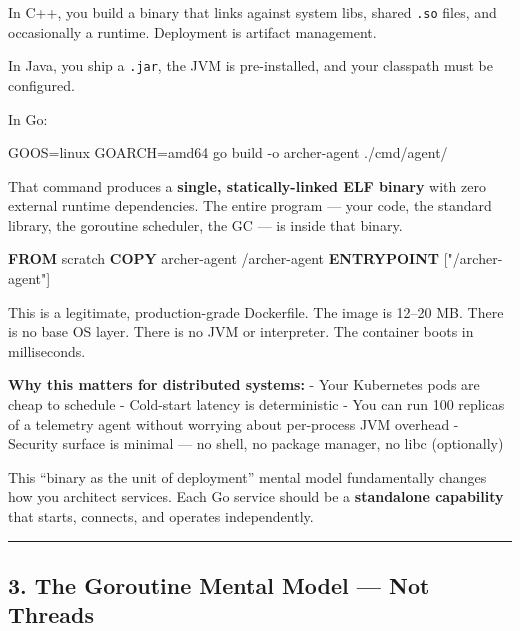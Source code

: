 \documentclass[
]{article}
\newenvironment{Shaded}{}{}
\newcommand{\AttributeTok}[1]{\textcolor[rgb]{0.49,0.56,0.16}{#1}}
\newcommand{\ExtensionTok}[1]{#1}
\newcommand{\KeywordTok}[1]{\textcolor[rgb]{0.00,0.44,0.13}{\textbf{#1}}}
\newcommand{\NormalTok}[1]{#1}
\newcommand{\OperatorTok}[1]{\textcolor[rgb]{0.40,0.40,0.40}{#1}}
\newcommand{\StringTok}[1]{\textcolor[rgb]{0.25,0.44,0.63}{#1}}
\newcommand{\VariableTok}[1]{\textcolor[rgb]{0.10,0.09,0.49}{#1}}
\begin{document}
In C++, you build a binary that links against system libs, shared
\texttt{.so} files, and occasionally a runtime. Deployment is artifact
management.

In Java, you ship a \texttt{.jar}, the JVM is pre-installed, and your
classpath must be configured.

In Go:

\begin{Shaded}
\begin{Highlighting}[]
\VariableTok{GOOS}\OperatorTok{=}\NormalTok{linux }\VariableTok{GOARCH}\OperatorTok{=}\NormalTok{amd64 }\ExtensionTok{go}\NormalTok{ build }\AttributeTok{{-}o}\NormalTok{ archer{-}agent ./cmd/agent/}
\end{Highlighting}
\end{Shaded}

That command produces a \textbf{single, statically-linked ELF binary}
with zero external runtime dependencies. The entire program --- your
code, the standard library, the goroutine scheduler, the GC --- is
inside that binary.

\begin{Shaded}
\begin{Highlighting}[]
\KeywordTok{FROM}\NormalTok{ scratch}
\KeywordTok{COPY}\NormalTok{ archer{-}agent /archer{-}agent}
\KeywordTok{ENTRYPOINT}\NormalTok{ [}\StringTok{"/archer{-}agent"}\NormalTok{]}
\end{Highlighting}
\end{Shaded}

This is a legitimate, production-grade Dockerfile. The image is 12--20
MB. There is no base OS layer. There is no JVM or interpreter. The
container boots in milliseconds.

\textbf{Why this matters for distributed systems:} - Your Kubernetes
pods are cheap to schedule - Cold-start latency is deterministic - You
can run 100 replicas of a telemetry agent without worrying about
per-process JVM overhead - Security surface is minimal --- no shell, no
package manager, no libc (optionally)

This ``binary as the unit of deployment'' mental model fundamentally
changes how you architect services. Each Go service should be a
\textbf{standalone capability} that starts, connects, and operates
independently.

\begin{center}\rule{0.5\linewidth}{0.5pt}\end{center}

\hypertarget{the-goroutine-mental-model-not-threads}{%
\subsection{3. The Goroutine Mental Model --- Not
Threads}\label{the-goroutine-mental-model-not-threads}}
\end{document}
